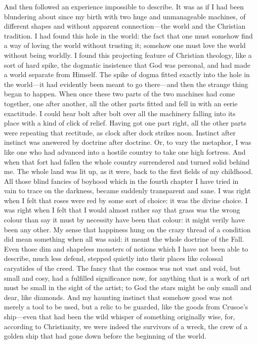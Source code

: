 And then followed an experience impossible to describe. It was as if I had been blundering about since my birth with two huge and unmanageable machines, of different shapes and without apparent connection—the world and the Christian tradition. I had found this hole in the world: the fact that one must somehow find a way of loving the world without trusting it; somehow one must love the world without being worldly. I found this projecting feature of Christian theology, like a sort of hard spike, the dogmatic insistence that God was personal, and had made a world separate from Himself. The spike of dogma fitted exactly into the hole in the world—it had evidently been meant to go there—and then the strange thing began to happen. When once these two parts of the two machines had come together, one after another, all the other parts fitted and fell in with an eerie exactitude. I could hear bolt after bolt over all the machinery falling into its place with a kind of click of relief. Having got one part right, all the other parts were repeating that rectitude, as clock after dock strikes noon. Instinct after instinct was answered by doctrine after doctrine. Or, to vary the metaphor, I was like one who had advanced into a hostile country to take one high fortress. And when that fort had fallen the whole country surrendered and turned solid behind me. The whole land was lit up, as it were, back to the first fields of my childhood. All those blind fancies of boyhood which in the fourth chapter I have tried in vain to trace on the darkness, became suddenly transparent and sane. I was right when I felt that roses were red by some sort of choice: it was the divine choice. I was right when I felt that I would almost rather say that grass was the wrong colour than say it must by necessity have been that colour: it might verily have been any other. My sense that happiness hung on the crazy thread of a condition did mean something when all was said: it meant the whole doctrine of the Fall. Even those dim and shapeless monsters of notions which I have not been able to describe, much less defend, stepped quietly into their places like colossal caryatides of the creed. The fancy that the cosmos was not vast and void, but small and cosy, had a fulfilled significance now, for anything that is a work of art must be small in the sight of the artist; to God the stars might be only small and dear, like diamonds. And my haunting instinct that somehow good was not merely a tool to be used, but a relic to be guarded, like the goods from Crusoe’s ship—even that had been the wild whisper of something originally wise, for, according to Christianity, we were indeed the survivors of a wreck, the crew of a golden ship that had gone down before the beginning of the world.

